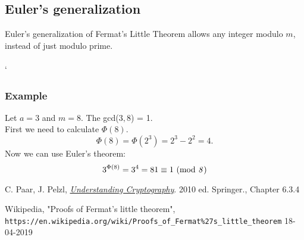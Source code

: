 \documentclass{article}
\begin{document}
 	\subsection*{Euler's generalization \cite{fermatsummary}}
 	Euler's generalization of Fermat's Little Theorem allows any integer modulo $m$, instead of just modulo prime.
 	\\
 	\\`
 	
 	\subsubsection*{Example}
 	Let $a = 3$ and $m = 8$. The gcd($3, 8$) = 1. 
 	\\
 	First we need to calculate $\Phi(8)$.
 	$$
 	\Phi(8) = \Phi(2^3) = 2^3-2^2 = 4.
 	$$
 	Now we can use Euler's theorem:
 	$$
 	3^{\Phi(8)} = 3^4 = 81 \equiv 1 \text{ (mod \textit{8})}
 	$$

	\newpage

	\begin{thebibliography}{99}
		
		C. Paar, J. Pelzl, 
		\textit{\underline{Understanding Cryptography}}. 2010 ed.
		Springer., Chapter 6.3.4 
		
		Wikipedia, "Proofs of Fermat's little theorem",
		\\\texttt{https://en.wikipedia.org/wiki/Proofs\_of\_Fermat\%27s\_little\_theorem} 18-04-2019
		
	\end{thebibliography}
\end{document}
